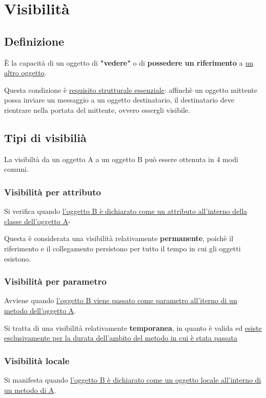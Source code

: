 \chapter{Visibilità}
\section{Definizione}
È la capacità di un oggetto di \textbf{"vedere"} o di \textbf{possedere un riferimento} a \uline{un altro oggetto}.

Questa condizione è \uline{requisito strutturale essenziale}: affinchè un oggetto mittente possa inviare un messaggio a un oggetto destinatario, il destinatario deve rientrare nella portata del mittente, ovvero essergli visibile.

\section{Tipi di visibilià}
La visibiltà da un oggetto A a un oggetto B può essere ottenuta in 4 modi comuni.

\subsection{Visibilità per attributo}
Si verifica quando \uline{l'oggetto B è dichiarato come un attributo all'interno della classe dell'oggetto A}-

Questa è considerata una visibilità relativamente \textbf{permanente}, poichè il riferimento e il collegamento persistono per tutto il tempo in cui gli oggetti esistono.

\begin{figure}[H]
    \centering
\end{figure}

\subsection{Visibilità per parametro}
Avviene quando \uline{l'oggetto B viene passato come parametro all'iterno di un metodo dell'oggetto A}.

Si tratta di una visibilità relativamente \textbf{temporanea}, in quanto è valida ed \uline{esiste esclusivamente per la durata dell'ambito del metodo in cui è stata passata}

\begin{figure}[H]
    \centering
\end{figure}

\subsection{Visibilità locale}
Si manifesta quando \uline{l'oggetto B è dichiarato come un oggetto locale all'interno di un metodo di A}.

